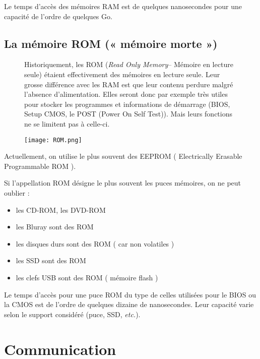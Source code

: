 Le temps d'accès des mémoires RAM est de quelques nanosecondes pour une capacité de l'ordre de quelques Go.


\subsection{La mémoire ROM (« mémoire morte »)}


\begin{figure}[h]
\begin{minipage}[c]{.49\linewidth}

Historiquement, les ROM (\textit{Read Only Memory}-- Mémoire en lecture seule) étaient effectivement des mémoires en lecture seule. Leur grosse différence avec les RAM est que leur contenu perdure malgré l'absence d'alimentation. Elles seront donc par exemple très utiles pour stocker les programmes et informations de démarrage (BIOS, Setup CMOS, le POST (Power On Self Test)). Mais leurs fonctions ne se limitent pas à celle-ci.

\end{minipage} \hfill
\begin{minipage}[c]{.49\linewidth}
\begin{center}
\texttt{[image: ROM.png]}
\label{}
\end{center}
\end{minipage}
\end{figure}
Actuellement, on utilise le plus souvent des EEPROM ( Electrically Erasable Programmable ROM ).

Si l'appellation ROM désigne le plus souvent les puces mémoires, on ne peut oublier :
\begin{itemize}
\item les CD-ROM, les DVD-ROM
\item les Bluray sont des ROM
\item les disques durs sont des ROM ( car non volatiles )
\item les SSD sont des ROM
\item les clefs USB sont des ROM ( mémoire flash )
\end{itemize}

Le temps d'accès pour une puce ROM du type de celles utilisées pour le BIOS ou la CMOS est de l'ordre de quelques dizaine de nanosecondes. Leur capacité varie selon le support considéré (puce, SSD, \textit{etc.}).


\section{Communication}

